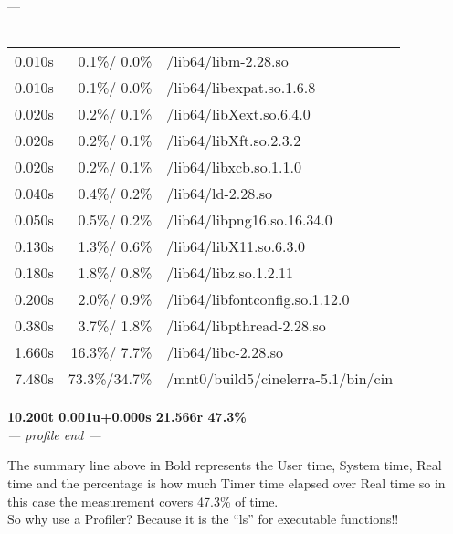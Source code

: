 ---\\
---\\
\begin{tabular}{@{}rrl}
 0.010s & 0.1\%/  0.0\% & /lib64/libm-2.28.so\\
 0.010s & 0.1\%/  0.0\% & /lib64/libexpat.so.1.6.8\\
 0.020s & 0.2\%/  0.1\% & /lib64/libXext.so.6.4.0\\
 0.020s & 0.2\%/  0.1\% & /lib64/libXft.so.2.3.2\\
 0.020s & 0.2\%/  0.1\% & /lib64/libxcb.so.1.1.0\\
 0.040s & 0.4\%/  0.2\% & /lib64/ld-2.28.so\\
 0.050s & 0.5\%/  0.2\% & /lib64/libpng16.so.16.34.0\\
 0.130s & 1.3\%/  0.6\% & /lib64/libX11.so.6.3.0\\
 0.180s & 1.8\%/  0.8\% & /lib64/libz.so.1.2.11\\
 0.200s & 2.0\%/  0.9\% & /lib64/libfontconfig.so.1.12.0\\
 0.380s & 3.7\%/  1.8\% & /lib64/libpthread-2.28.so\\
 1.660s & 16.3\%/ 7.7\% & /lib64/libc-2.28.so\\
 7.480s & 73.3\%/34.7\% & /mnt0/build5/cinelerra-5.1/bin/cin\\
\end{tabular}

\textbf{10.200t 0.001u+0.000s 21.566r  47.3\%}\\
\textit{--- profile end ---}

The summary line above in Bold represents the User time, System time, Real time and the percentage is how much Timer time elapsed over Real time so in this case the measurement covers 47.3\% of time.\\
So why use a Profiler? Because it is the ``ls'' for executable functions!!
